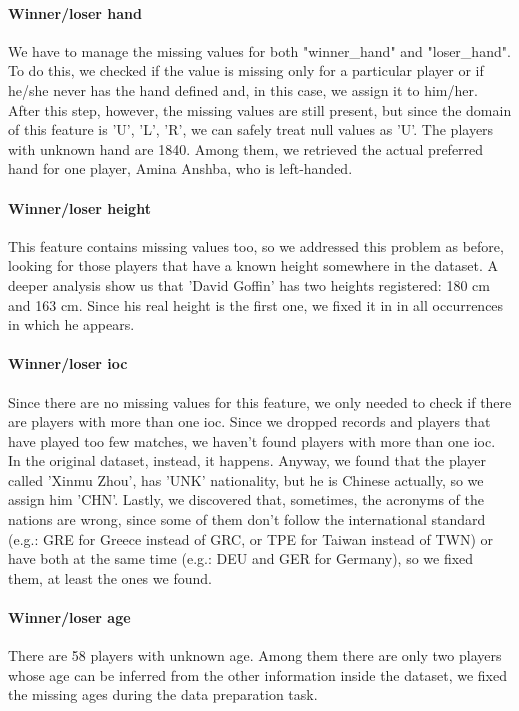 \paragraph{Winner/loser hand}
We have to manage the missing values for both "winner\_hand" and "loser\_hand". To do this, we checked if the value is missing only for a particular player or if he/she never has the hand defined and, in this case, we assign it to him/her. After this step, however, the missing values are still present, but since the domain of this feature is {'U', 'L', 'R'}, we can safely treat null values as 'U'. The players with unknown hand are 1840. Among them, we retrieved the actual preferred hand for one player, Amina Anshba, who is left-handed.

\paragraph{Winner/loser height}
This feature contains missing values too, so we addressed this problem as before, looking for those players that have a known height somewhere in the dataset. A deeper analysis show us that 'David Goffin' has two heights registered: 180 cm and 163 cm. Since his real height is the first one, we fixed it in in all occurrences in which he appears.

\paragraph{Winner/loser ioc}
Since there are no missing values for this feature, we only needed to check if there are players with more than one ioc. Since we dropped records and players that have played too few matches, we haven't found players with more than one ioc. In the original dataset, instead, it happens. Anyway, we found that the player called 'Xinmu Zhou', has 'UNK' nationality, but he is Chinese actually, so we assign him 'CHN'. Lastly, we discovered that, sometimes, the acronyms of the nations are wrong, since some of them don't follow the international standard (e.g.: GRE for Greece instead of GRC, or TPE for Taiwan instead of TWN) or have both at the same time (e.g.: DEU and GER for Germany), so we fixed them, at least the ones we found.

\paragraph{Winner/loser age}
There are 58 players with unknown age. Among them there are only two players whose age can be inferred from the other information inside the dataset, we fixed the missing ages during the data preparation task. 

